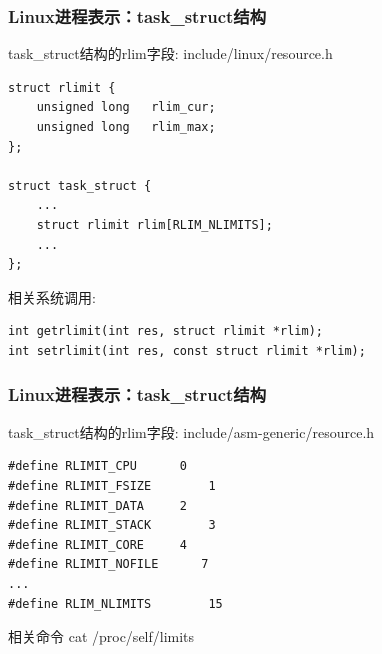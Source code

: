 \documentclass[xcolor=svgnames]{beamer}
\begin{document}
\begin{CJK*}{UTF8}{gbsn}
%
%
%
%


\begin{frame}[fragile]
\frametitle{Linux进程表示：task\_struct结构}
\begin{block}{task\_struct结构的rlim字段: include/linux/resource.h}
\begin{verbatim}
struct rlimit {
    unsigned long   rlim_cur;
    unsigned long   rlim_max;
};

struct task_struct {
    ...
    struct rlimit rlim[RLIM_NLIMITS];
    ...
};
\end{verbatim}
\end{block}
\begin{block}{相关系统调用:}
\begin{verbatim}
int getrlimit(int res, struct rlimit *rlim);
int setrlimit(int res, const struct rlimit *rlim);
\end{verbatim}
\end{block}
\end{frame}

\begin{frame}[fragile]
\frametitle{Linux进程表示：task\_struct结构}
\begin{block}{task\_struct结构的rlim字段: include/asm-generic/resource.h}
\begin{verbatim}
#define RLIMIT_CPU      0   
#define RLIMIT_FSIZE        1  
#define RLIMIT_DATA     2   
#define RLIMIT_STACK        3 
#define RLIMIT_CORE     4   
#define RLIMIT_NOFILE      7  
...
#define RLIM_NLIMITS        15
\end{verbatim}
\end{block}
\begin{block}{相关命令}
cat /proc/self/limits
\end{block}
\end{frame}


\end{CJK*}
\end{document}
